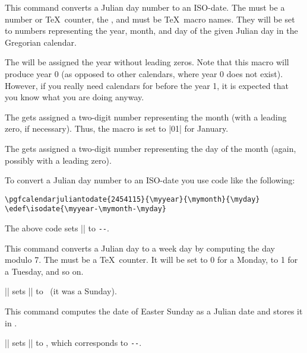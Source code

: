 \begin{command}{\pgfcalendarjuliantodate{}}
    This command converts a Julian day number to an ISO-date. The  must be a number or \TeX\ counter, the ,  and  must be \TeX\ macro names. They will be set to
    numbers representing the year, month, and day of the given Julian day in
    the Gregorian calendar.

    The  will be assigned the year without leading zeros. Note
    that this macro will produce year 0 (as opposed to other calendars, where
    year 0 does not exist). However, if you really need calendars for before
    the year 1, it is expected that you know what you are doing anyway.

    The  gets assigned a two-digit number representing the
    month (with a leading zero, if necessary). Thus, the macro is set to |01|
    for January.

    The  gets assigned a two-digit number representing the day
    of the month (again, possibly with a leading zero).

    To convert a Julian day number to an ISO-date you use code like the
    following:
\begin{verbatim}
\pgfcalendarjuliantodate{2454115}{\myyear}{\mymonth}{\myday}
\edef\isodate{\myyear-\mymonth-\myday}
\end{verbatim}
    The above code sets |\isodate| to
    \edef\isodate{\myyear-\mymonth-\myday}\texttt{\isodate}.
\end{command}

\begin{command}{\pgfcalendarjuliantoweekday{}}
    This command converts a Julian day to a week day by computing the day
    modulo 7. The  must be a \TeX\ counter. It will be
    set to 0 for a Monday, to 1 for a Tuesday, and so on.

    \example || sets
    |\mycount| to
    \the\mycount\ (it was a Sunday).
\end{command}

\begin{command}{\pgfcalendareastersunday{}}
    This command computes the date of Easter Sunday as a Julian date and stores
    it in .

    \example || sets
    |\mycount| to
    \the\mycount, which corresponds to
    \pgfcalendarjuliantodate{\mycount}{\myyear}{\mymonth}{\myday}%
    \edef\isodate{\myyear-\mymonth-\myday}\texttt{\isodate}.
\end{command}

